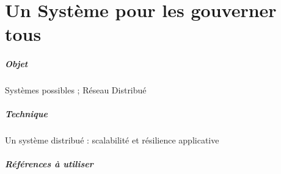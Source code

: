 \chapter{Un Système pour les gouverner tous}
\paragraph{Objet} Systèmes possibles ; Réseau Distribué
\paragraph{Technique} Un système distribué : scalabilité et résilience applicative

\paragraph{Références à utiliser}
\cite{DarkWeb0}
\cite{Deleuze0}
\cite{Foucault0}
\cite{Negri0}
\cite{Pieces0}
\cite{ProgrammableCity0}
\cite{ProgrammableCity1}
\cite{PsychoPass}



 
